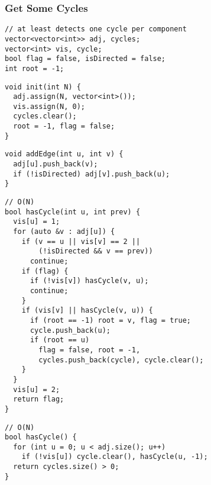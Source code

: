 \documentclass[twoside]{article}
\newcommand{\fileTitleStyle}{\large\underline}
\begin{document}
\begin{multicols*}{2}
\subsubsection*{Get Some Cycles}
\begin{verbatim}
// at least detects one cycle per component
vector<vector<int>> adj, cycles;
vector<int> vis, cycle;
bool flag = false, isDirected = false;
int root = -1;
\end{verbatim}
\vspace{-12pt}
\begin{verbatim}
void init(int N) {
  adj.assign(N, vector<int>());
  vis.assign(N, 0);
  cycles.clear();
  root = -1, flag = false;
}
\end{verbatim}
\vspace{-12pt}
\begin{verbatim}
void addEdge(int u, int v) {
  adj[u].push_back(v);
  if (!isDirected) adj[v].push_back(u);
}
\end{verbatim}
\vspace{-12pt}
\begin{verbatim}
// O(N)
bool hasCycle(int u, int prev) {
  vis[u] = 1;
  for (auto &v : adj[u]) {
    if (v == u || vis[v] == 2 ||
        (!isDirected && v == prev))
      continue;
    if (flag) {
      if (!vis[v]) hasCycle(v, u);
      continue;
    }
    if (vis[v] || hasCycle(v, u)) {
      if (root == -1) root = v, flag = true;
      cycle.push_back(u);
      if (root == u)
        flag = false, root = -1,
        cycles.push_back(cycle), cycle.clear();
    }
  }
  vis[u] = 2;
  return flag;
}
\end{verbatim}
\vspace{-12pt}
\begin{verbatim}
// O(N)
bool hasCycle() {
  for (int u = 0; u < adj.size(); u++)
    if (!vis[u]) cycle.clear(), hasCycle(u, -1);
  return cycles.size() > 0;
}
\end{verbatim}

\subsubsectionfont{\centering\bfseries\Large}
\subsubsectionfont{\fileTitleStyle}

\end{multicols*}
\end{document}

